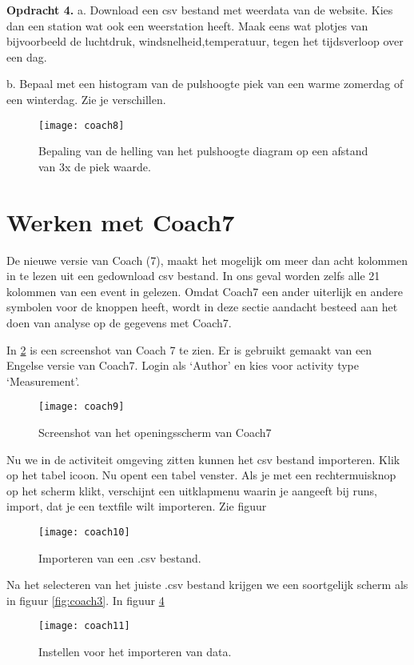 \textbf{Opdracht 4.}
a.
Download een csv bestand met weerdata van de \hisparc website.
Kies dan een \hisparc station wat ook een weerstation heeft.
Maak eens wat plotjes van bijvoorbeeld de luchtdruk, windsnelheid,temperatuur,
tegen het tijdsverloop over een dag.

b. Bepaal met een histogram van de pulshoogte piek van een warme zomerdag of 
een winterdag. Zie je verschillen. 

\begin{figure}
    \centering
    \texttt{[image: coach8]}
    \caption{Bepaling van de helling van het pulshoogte diagram op een afstand
    van 3x de piek waarde.}
    \label{fig:coach8}
\end{figure}

\section{Werken met Coach7}

De nieuwe versie van Coach (7), maakt het mogelijk om meer dan acht kolommen in te lezen
uit een gedownload csv bestand. In ons geval worden zelfs alle 21 kolommen van een event in gelezen.
Omdat Coach7 een ander uiterlijk en andere symbolen voor de knoppen heeft, wordt 
in deze sectie aandacht besteed aan het doen van analyse op de gegevens met Coach7.

In \ref{fig:coach9} is een screenshot van Coach 7 te zien. Er is gebruikt gemaakt van een Engelse versie van 
Coach7. Login als `Author' en kies voor activity type `Measurement'.

\begin{figure}
    \centering
    \texttt{[image: coach9]}
    \caption{Screenshot van het openingsscherm van Coach7}
    \label{fig:coach9}
\end{figure}

Nu we in de activiteit omgeving zitten kunnen het csv bestand importeren.
Klik op het tabel icoon. Nu opent een tabel venster.
Als je met een rechtermuisknop op het scherm klikt, verschijnt een uitklapmenu
waarin je aangeeft bij runs, import, dat je een textfile wilt importeren. Zie figuur

\begin{figure}
    \centering
    \texttt{[image: coach10]}
    \caption{Importeren van een .csv bestand.}
    \label{fig:coach10}
\end{figure}

Na het selecteren van het juiste .csv bestand krijgen we een soortgelijk scherm
als in figuur \ref{fig:coach3}. In figuur \ref{fig:coach11}

\begin{figure}
    \centering
    \texttt{[image: coach11]}
    \caption{Instellen voor het importeren van data.}
    \label{fig:coach11}
\end{figure}


